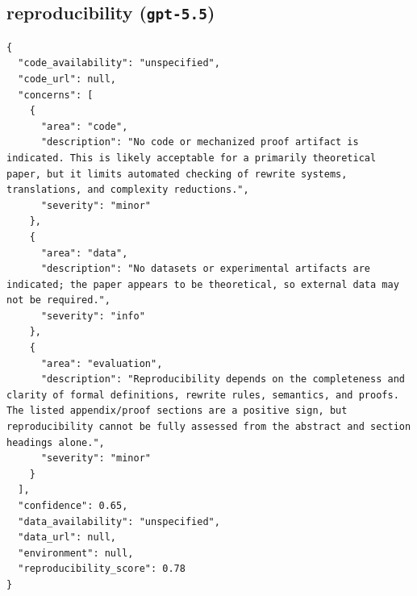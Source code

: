 \documentclass[11pt]{article}
\begin{document}
\subsection*{reproducibility (\texttt{gpt-5.5})}
\begin{verbatim}
{
  "code_availability": "unspecified",
  "code_url": null,
  "concerns": [
    {
      "area": "code",
      "description": "No code or mechanized proof artifact is indicated. This is likely acceptable for a primarily theoretical paper, but it limits automated checking of rewrite systems, translations, and complexity reductions.",
      "severity": "minor"
    },
    {
      "area": "data",
      "description": "No datasets or experimental artifacts are indicated; the paper appears to be theoretical, so external data may not be required.",
      "severity": "info"
    },
    {
      "area": "evaluation",
      "description": "Reproducibility depends on the completeness and clarity of formal definitions, rewrite rules, semantics, and proofs. The listed appendix/proof sections are a positive sign, but reproducibility cannot be fully assessed from the abstract and section headings alone.",
      "severity": "minor"
    }
  ],
  "confidence": 0.65,
  "data_availability": "unspecified",
  "data_url": null,
  "environment": null,
  "reproducibility_score": 0.78
}
\end{verbatim}
\end{document}
